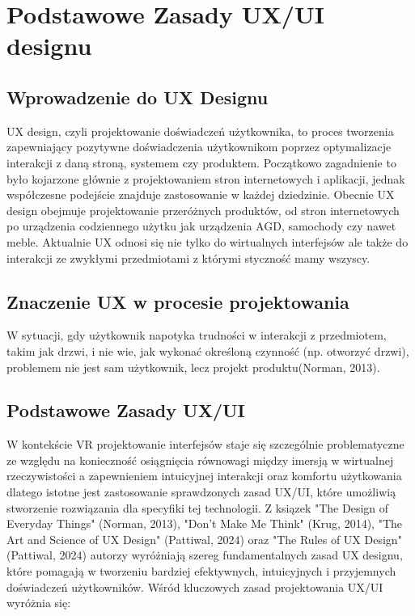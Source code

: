 \chapter{Podstawowe Zasady UX/UI designu}

\section{Wprowadzenie do UX Designu}

 UX design, czyli projektowanie doświadczeń użytkownika, to proces tworzenia zapewniający pozytywne doświadczenia użytkownikom poprzez optymalizacje interakcji z daną stroną, systemem czy produktem. Początkowo zagadnienie to było kojarzone głównie z projektowaniem stron internetowych i aplikacji, jednak współczesne podejście znajduje zastosowanie w każdej dziedzinie. Obecnie UX design obejmuje projektowanie przeróżnych produktów, od stron internetowych po urządzenia codziennego użytku jak urządzenia AGD, samochody czy nawet meble. Aktualnie UX odnosi się nie tylko do wirtualnych interfejsów ale także do interakcji ze zwykłymi przedmiotami z którymi styczność mamy wszyscy.

 \section{Znaczenie UX w procesie projektowania}

 W sytuacji, gdy użytkownik napotyka trudności w interakcji z przedmiotem, takim jak drzwi, i nie wie, jak wykonać określoną czynność (np. otworzyć drzwi), problemem nie jest sam użytkownik, lecz projekt produktu(Norman, 2013).


\section{Podstawowe Zasady UX/UI}

W kontekście VR projektowanie interfejsów staje się szczególnie problematyczne ze względu na konieczność osiągnięcia równowagi między imersją w wirtualnej rzeczywistości a zapewnieniem intuicyjnej interakcji oraz komfortu użytkowania dlatego istotne jest zastosowanie sprawdzonych zasad UX/UI, które umożliwią stworzenie rozwiązania dla specyfiki tej technologii.
Z ksiązek "The Design of Everyday Things" (Norman, 2013), "Don't Make Me Think" (Krug, 2014), "The Art and Science of UX Design" (Pattiwal, 2024) oraz "The Rules of UX Design" (Pattiwal, 2024) autorzy wyróżniają szereg fundamentalnych zasad UX designu, które pomagają w tworzeniu bardziej efektywnych, intuicyjnych i przyjemnych doświadczeń użytkowników.
Wśród kluczowych zasad projektowania UX/UI wyróżnia się:

